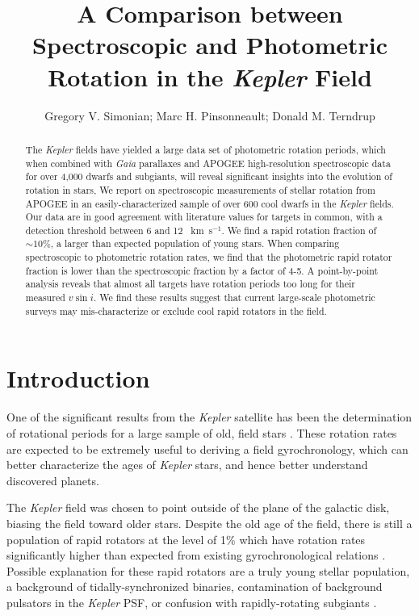 \documentclass[manuscript]{aastex6}
\newcommand{\vsini}{\ensuremath{v \sin i}}
\newcommand{\Kepler}{\mbox{\textit{Kepler}}}
\newcommand{\Gaia}{\mbox{\textit{Gaia}}}
\newcommand{\kms}{\textrm{~km~s}\ensuremath{^{-1}}}
\begin{document}
\title{A Comparison between Spectroscopic and Photometric Rotation in the
\Kepler{} Field}
\author{Gregory V. Simonian; Marc H. Pinsonneault; Donald M. Terndrup}

\begin{abstract}
    The \Kepler{} fields have yielded a large data set of photometric rotation
    periods, which when combined with \Gaia{} parallaxes and APOGEE
    high-resolution spectroscopic data for over 4,000 dwarfs and subgiants, 
    will reveal significant insights into the evolution of rotation in stars, 
    We report on 
    spectroscopic measurements of stellar rotation from APOGEE in an
    easily-characterized sample of over 600 cool dwarfs in the
    \Kepler{} fields. Our data are in good agreement with literature values for
    targets in common, with a detection threshold between 6 and 12 \kms. We
    find a rapid rotation fraction of \(\sim 10\%\), a larger than expected
    population of young stars. When comparing spectroscopic to photometric
    rotation rates, we find that the photometric rapid rotator fraction is
    lower than the spectroscopic fraction by a factor of 4-5. A point-by-point
    analysis reveals that almost all targets have rotation periods too long for
    their measured \vsini{}. We find these results suggest that current 
    large-scale photometric surveys may mis-characterize or exclude cool rapid 
    rotators in the field. 
\end{abstract}

\section{Introduction}

One of the significant results from the \Kepler{} satellite has been the
determination of rotational periods for a large sample of old, field stars
\citep{Basri11,Affer12,Nielsen13,Reinhold13,McQuillan14,Garcia14}.
These rotation rates are expected to be extremely useful to deriving a field
gyrochronology, which can better characterize the ages of
\Kepler{} stars, and hence better understand discovered planets.

The \Kepler{} field was chosen to point outside of the plane of the galactic
disk, biasing the field toward older stars. Despite the old age of the
field, there is still a population of rapid rotators at the level of 1\% 
which have rotation rates significantly higher than expected from
existing gyrochronological relations \citep{McQuillan14}. Possible explanation
for these rapid rotators are a truly young stellar population, a background of
tidally-synchronized binaries, contamination of background pulsators in the
\Kepler{} PSF, or confusion with rapidly-rotating subgiants \citep{vanSaders13}. 
\end{document}
